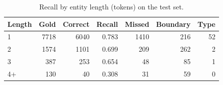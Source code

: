\begin{table}[t]
\centering
\small
\caption{Recall by entity length (tokens) on the test set.}
\label{tab:length}
\begin{tabular}{lrrrrrr}
\toprule
Length & Gold & Correct & Recall & Missed & Boundary & Type \\
\midrule
1 & 7718 & 6040 & 0.783 & 1410 & 216 & 52 \\
2 & 1574 & 1101 & 0.699 & 209 & 262 & 2 \\
3 & 387 & 253 & 0.654 & 48 & 85 & 1 \\
4+ & 130 & 40 & 0.308 & 31 & 59 & 0 \\
\bottomrule
\end{tabular}
\end{table}
